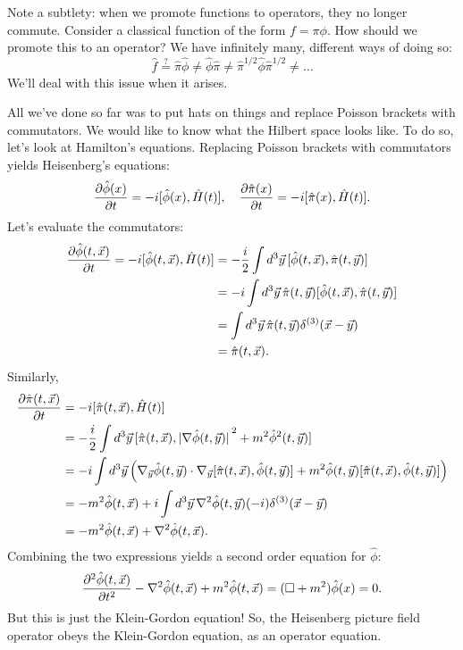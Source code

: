 \documentclass{article}
\begin{document}
Note a subtlety: when we promote functions to operators, they no longer commute. Consider a classical function of the form $ f = \pi \phi $. How should we promote this to an operator? We have infinitely many, different ways of doing so:
\[
\hat{f} \stackrel{?}{=} \hat{\pi} \hat{\phi} \neq \hat{\phi} \hat{\pi} \neq \hat{\pi}^{1/2} \hat{\phi} \hat{\pi}^{1/2} \neq \dots
\]
We'll deal with this issue when it arises.
\par
All we've done so far was to put hats on things and replace Poisson brackets with commutators. We would like to know what the Hilbert space looks like. To do so, let's look at Hamilton's equations. Replacing Poisson brackets with commutators yields Heisenberg's equations:
\begin{equation}
	\pdv{\hat{\phi}(x)}{t} = -i [\hat{\phi}(x), \hat{H}(t)], \quad \pdv{\hat{\pi}(x)}{t} = -i [\hat{\pi}(x), \hat{H}(t)].
\end{equation}
Let's evaluate the commutators:
\begin{align}
	\begin{split}
		\pdv{\hat{\phi}(t,\vec{x})}{t} = -i [\hat{\phi}(t,\vec{x}), \hat{H}(t)] &= -\frac{i}{2} \int \dd[3]{\vec{y}} [\hat{\phi}(t,\vec{x}), \hat{\pi}(t, \vec{y})] \\
		&= -i \int \dd[3]{\vec{y}} \hat{\pi}(t, \vec{y})[\hat{\phi}(t,\vec{x}), \hat{\pi}(t,\vec{y})] \\
		&= \int \dd[3]{\vec{y}} \hat{\pi} (t, \vec{y}) \delta^{(3)}(\vec{x} - \vec{y}) \\
		&= \hat{\pi}(t, \vec{x}).
	\end{split}
\end{align}
Similarly,
\begin{align}
	\begin{split}
		\pdv{\hat{\pi}(t,\vec{x})}{t} &= -i [\hat{\pi}(t,\vec{x}), \hat{H}(t)] \\
		&= -\frac{i}{2} \int \dd[3]{\vec{y}} [\hat{\pi}(t,\vec{x}), \abs*{\nabla \hat{\phi}(t,\vec{y})}^{2} + m^{2} \hat{\phi}^{2}(t,\vec{y})] \\
		&= -i \int \dd[3]{\vec{y}} \qty(\nabla_{\vec{y}} \hat{\phi}(t,\vec{y}) \cdot \nabla_{\vec{y}} [\hat{\pi}(t,\vec{x}), \hat{\phi}(t,\vec{y})] + m^{2} \hat{\phi}(t,\vec{y}) [\hat{\pi}(t,\vec{x}),\hat{\phi}(t,\vec{y})] ) \\
		&= -m^{2} \hat{\phi}(t,\vec{x}) + i \int \dd[3]{\vec{y}} \nabla^{2} \hat{\phi}(t,\vec{y}) (-i) \delta^{(3)}(\vec{x} - \vec{y}) \\
		&= -m^{2} \hat{\phi}(t,\vec{x}) + \nabla^{2} \hat{\phi}(t,\vec{x}).
	\end{split}
\end{align}
Combining the two expressions yields a second order equation for $ \hat{\phi} $:
\begin{equation} \label{kleingordonoperator}
	\pdv[2]{\hat{\phi}(t,\vec{x})}{t} - \nabla^{2} \hat{\phi}(t,\vec{x}) + m^{2}\hat{\phi}(t,\vec{x}) = (\Box + m^{2}) \hat{\phi}(x) = 0.
\end{equation}
But this is just the Klein-Gordon equation! So, the Heisenberg picture field operator obeys the Klein-Gordon equation, as an operator equation.
\end{document}
